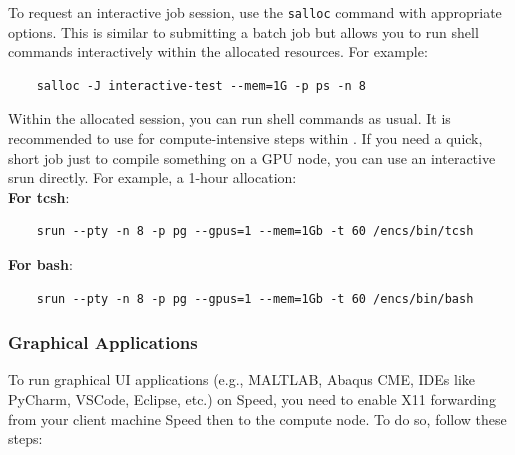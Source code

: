 To request an interactive job session, use the \texttt{salloc} command with appropriate options.
This is similar to submitting a batch job but allows you to run shell commands interactively 
within the allocated resources. For example:
\begin{verbatim}
	salloc -J interactive-test --mem=1G -p ps -n 8
\end{verbatim}

Within the allocated  session, you can run shell commands as usual. 
It is recommended to use  for compute-intensive steps within . 
If you need a quick, short job just to compile something on a GPU node, 
you can use an interactive srun directly. For example, a 1-hour allocation:\\

\noindent \textbf{For tcsh}:
\begin{verbatim}
	srun --pty -n 8 -p pg --gpus=1 --mem=1Gb -t 60 /encs/bin/tcsh
\end{verbatim}

\noindent \textbf{For bash}:
\begin{verbatim}
	srun --pty -n 8 -p pg --gpus=1 --mem=1Gb -t 60 /encs/bin/bash
\end{verbatim}


\subsubsection{Graphical Applications}
\label{sect:graphical-applications}

To run graphical UI applications (e.g., MALTLAB, Abaqus CME, IDEs like PyCharm, VSCode, Eclipse, etc.) on Speed, 
you need to enable X11 forwarding from your client machine Speed then to the compute node.
To do so, follow these steps:

